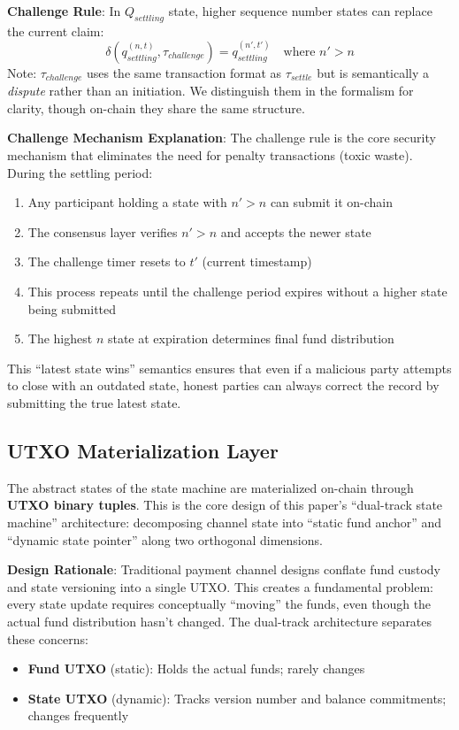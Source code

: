 \textbf{Challenge Rule}: In $Q_{settling}$ state, higher sequence number states can replace the current claim:
$$\delta(q_{settling}^{(n, t)}, \tau_{challenge}) = q_{settling}^{(n', t')} \quad \text{where } n' > n$$
Note: $\tau_{challenge}$ uses the same transaction format as $\tau_{settle}$ but is semantically a \textit{dispute} rather than an initiation. We distinguish them in the formalism for clarity, though on-chain they share the same structure.

\textbf{Challenge Mechanism Explanation}:
The challenge rule is the core security mechanism that eliminates the need for penalty transactions (toxic waste). During the settling period:
\begin{enumerate}
    \item Any participant holding a state with $n' > n$ can submit it on-chain
    \item The consensus layer verifies $n' > n$ and accepts the newer state
    \item The challenge timer resets to $t'$ (current timestamp)
    \item This process repeats until the challenge period expires without a higher state being submitted
    \item The highest $n$ state at expiration determines final fund distribution
\end{enumerate}

This ``latest state wins'' semantics ensures that even if a malicious party attempts to close with an outdated state, honest parties can always correct the record by submitting the true latest state.

\subsection{UTXO Materialization Layer}

The abstract states of the state machine are materialized on-chain through \textbf{UTXO binary tuples}. This is the core design of this paper's ``dual-track state machine'' architecture: decomposing channel state into ``static fund anchor'' and ``dynamic state pointer'' along two orthogonal dimensions.

\textbf{Design Rationale}:
Traditional payment channel designs conflate fund custody and state versioning into a single UTXO. This creates a fundamental problem: every state update requires conceptually ``moving'' the funds, even though the actual fund distribution hasn't changed. The dual-track architecture separates these concerns:
\begin{itemize}
    \item \textbf{Fund UTXO} (static): Holds the actual funds; rarely changes
    \item \textbf{State UTXO} (dynamic): Tracks version number and balance commitments; changes frequently
\end{itemize}

